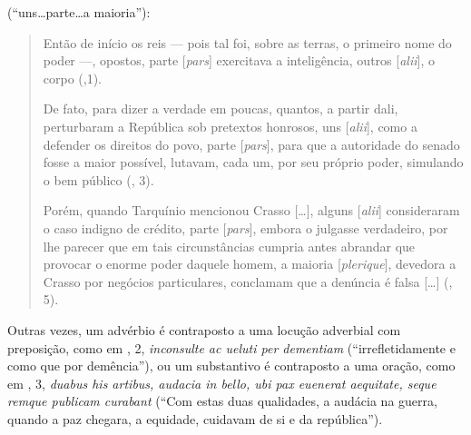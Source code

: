 (“uns\ldots{}parte\ldots{}a maioria”): \begin{quote} Então de início os reis --- pois tal
  foi, sobre as terras, o primeiro nome do poder ---, opostos, parte
  [\emph{pars}] exercitava a inteligência, outros [\emph{alii}], o corpo (,1).

 
De fato, para dizer a verdade em poucas, quantos, a partir dali, perturbaram a
República sob pretextos honrosos, uns [\emph{alii}], como a defender os
direitos do povo, parte [\emph{pars}], para que a autoridade do senado fosse a
maior possível, lutavam, cada um, por seu próprio poder, simulando o bem
público (, 3).
 
Porém, quando Tarquínio mencionou Crasso [\ldots{}], alguns [\emph{alii}]
consideraram o caso indigno de crédito, parte [\emph{pars}],  embora o
julgasse verdadeiro, por lhe parecer que em tais circunstâncias cumpria antes
abrandar que provocar o enorme poder daquele homem, a maioria
[\emph{plerique}], devedora a Crasso por negócios particulares, conclamam que a
denúncia é falsa [\ldots{}] (, 5).

\end{quote} Outras vezes, um advérbio é contraposto a uma locução adverbial com
preposição, como em , 2, \emph{inconsulte ac ueluti per dementiam}
(“irrefletidamente e como que por demência”), ou um substantivo é contraposto a
uma oração, como em , 3, \emph{duabus his artibus, audacia in bello, ubi pax
euenerat aequitate, seque remque publicam curabant} (“Com estas duas
qualidades, a audácia na guerra, quando a paz chegara, a equidade, cuidavam de
si e da república”).

